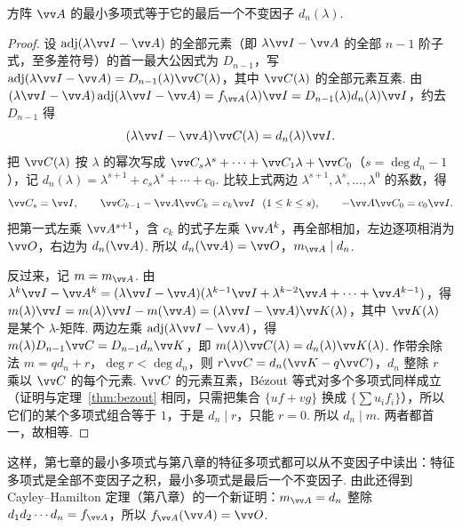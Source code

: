 	\begin{corollary}\label{cor:minpolyinvfactor}
		方阵 $\vv A$ 的最小多项式等于它的最后一个不变因子 $d_n(\lambda)$.
	\end{corollary}
	\begin{proof}
		设 $\operatorname{adj}(\lambda\vv I-\vv A)$ 的全部元素（即 $\lambda\vv I-\vv A$ 的全部 $n-1$ 阶子式，至多差符号）的首一最大公因式为 $D_{n-1}$，写 $\operatorname{adj}(\lambda\vv I-\vv A)=D_{n-1}(\lambda)\vv C(\lambda)$，其中 $\vv C(\lambda)$ 的全部元素互素. 由 $(\lambda\vv I-\vv A)\operatorname{adj}(\lambda\vv I-\vv A)=f_{\vv A}(\lambda)\vv I=D_{n-1}(\lambda)d_n(\lambda)\vv I$，约去 $D_{n-1}$ 得
		\[(\lambda\vv I-\vv A)\vv C(\lambda)=d_n(\lambda)\vv I.\]
		把 $\vv C(\lambda)$ 按 $\lambda$ 的幂次写成 $\vv C_s\lambda^s+\cdots+\vv C_1\lambda+\vv C_0$（$s=\deg d_n-1$），记 $d_n(\lambda)=\lambda^{s+1}+c_s\lambda^s+\cdots+c_0$. 比较上式两边 $\lambda^{s+1},\lambda^s,\ldots,\lambda^0$ 的系数，得
		\[\vv C_s=\vv I,\qquad \vv C_{k-1}-\vv A\vv C_k=c_k\vv I\ \ (1\le k\le s),\qquad -\vv A\vv C_0=c_0\vv I.\]
		把第一式左乘 $\vv A^{s+1}$，含 $c_k$ 的式子左乘 $\vv A^k$，再全部相加，左边逐项相消为 $\vv O$，右边为 $d_n(\vv A)$. 所以 $d_n(\vv A)=\vv O$，$m_{\vv A}\mid d_n$.
		
		反过来，记 $m=m_{\vv A}$. 由 $\lambda^k\vv I-\vv A^k=(\lambda\vv I-\vv A)(\lambda^{k-1}\vv I+\lambda^{k-2}\vv A+\cdots+\vv A^{k-1})$，得 $m(\lambda)\vv I=m(\lambda)\vv I-m(\vv A)=(\lambda\vv I-\vv A)\vv K(\lambda)$，其中 $\vv K(\lambda)$ 是某个 $\lambda$-矩阵. 两边左乘 $\operatorname{adj}(\lambda\vv I-\vv A)$，得 $m(\lambda)D_{n-1}\vv C=D_{n-1}d_n\vv K$，即 $m(\lambda)\vv C(\lambda)=d_n(\lambda)\vv K(\lambda)$. 作带余除法 $m=qd_n+r$，$\deg r<\deg d_n$，则 $r\vv C=d_n(\vv K-q\vv C)$，$d_n$ 整除 $r$ 乘以 $\vv C$ 的每个元素. $\vv C$ 的元素互素，Bézout 等式对多个多项式同样成立（证明与定理~\ref{thm:bezout} 相同，只需把集合 $\{uf+vg\}$ 换成 $\{\sum u_if_i\}$），所以它们的某个多项式组合等于 $1$，于是 $d_n\mid r$，只能 $r=0$. 所以 $d_n\mid m$. 两者都首一，故相等.
	\end{proof}
	
	这样，第七章的最小多项式与第八章的特征多项式都可以从不变因子中读出：特征多项式是全部不变因子之积，最小多项式是最后一个不变因子. 由此还得到 Cayley–Hamilton 定理（第八章）的一个新证明：$m_{\vv A}=d_n$ 整除 $d_1d_2\cdots d_n=f_{\vv A}$，所以 $f_{\vv A}(\vv A)=\vv O$.
	
